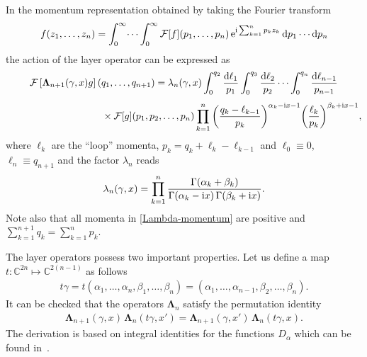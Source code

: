 In the momentum representation obtained by taking the Fourier transform
\begin{gather*}
f(z_1,\dots, z_n)=\int_{0}^\infty\dots\int_0^\infty \mathcal{F}[f](p_1,\dots, p_n) \,{\rm e}^{{\rm i}\sum_{k=1}^n p_k z_k}\, {\rm d}p_1\cdots {\rm d}p_n
\end{gather*}
the action of the layer operator can be expressed as
\begin{gather}
\mathcal{F}\left[\boldsymbol\Lambda_{n+1}(\gamma,x) g\right](q_1,\dots,q_{n+1})
 =\lambda_n(\gamma,x)\int_{0}^{q_2} \frac{{\rm d}\ell_1}{p_1}\int_{0}^{q_3}
 \frac{{\rm d}\ell_2}{p_2} \cdots \int_{0}^{q_n} \frac{{\rm d}\ell_{n-1}}{p_{n-1}}\notag
 \\[1ex] \hphantom{\mathcal{F}\left[\boldsymbol\Lambda_{n+1}(\gamma,x) g\right] =\qquad}
 {}\times \mathcal{F}[g](p_1,p_2,\dots,p_n)\prod_{k=1}^{n}
 \bigg(\frac{q_k-\ell_{k-1}}{p_k}\bigg)^{\alpha_k-{\rm i}x-1}
 \bigg(\frac{\ell_k}{p_k}\bigg)^{\beta_k+{\rm i}x-1},\label{Lambda-momentum}
\end{gather}
where $\ell_k$ are the ``loop'' momenta, $ p_k= q_k+\ell_k-\ell_{k-1}$ and $ \ell_0\equiv 0$, $\ell_n\equiv q_{n+1}$ and the factor $\lambda_n$ reads
\begin{gather*}
\lambda_n(\gamma,x)=\prod_{k=1}^{n}\frac{\Gamma(\alpha_k+\beta_k)}{\Gamma(\alpha_k-{\rm i}x)\,\Gamma(\beta_k+{\rm i}x)}.
\end{gather*}
Note also that all momenta in \eqref{Lambda-momentum} are positive and $\sum_{k=1}^{n+1} q_k=\sum_{k=1}^n p_k$.


The layer operators possess two important properties. Let us define a map $t\colon \mathbb C^{2n} \mapsto \mathbb C^{2(n-1)}$ as follows
\begin{gather*}%
{t}\gamma= t(\alpha_1,\dots,\alpha_{n},\beta_{1},\dots,\beta_{n})= (\alpha_1,\dots,\alpha_{n-1},\beta_{2},\dots,\beta_{n}).
\end{gather*}
It can be checked that the operators $\boldsymbol \Lambda_n$ satisfy the permutation identity
 \begin{gather}\label{Lambda-permutation-identity}
\boldsymbol\Lambda_{n+1}(\gamma,x)\,\boldsymbol\Lambda_n(t\gamma,x')
 =\boldsymbol\Lambda_{n+1}(\gamma,x')\,\boldsymbol\Lambda_n(t\gamma,x).
\end{gather}
The derivation is based on integral identities for the functions $D_\alpha$ which can be found in~\cite{Derkachov:2002tf}.

